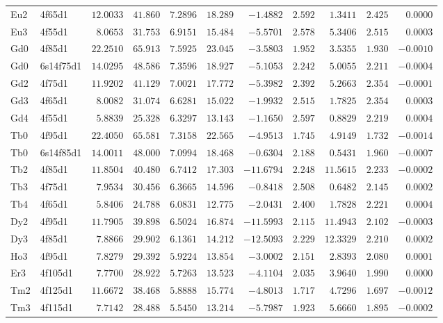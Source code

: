 \begin{table}[H]
{\begin{tabular}{llrrrrrrrrr}
Eu2 & 4f65d1 &$12.0033$ &$41.860$ &$7.2896$ &$18.289$ &$-1.4882$ &$2.592$ &$1.3411$ &$2.425$ &$0.0000$ \\
Eu3 & 4f55d1 &$8.0653$ &$31.753$ &$6.9151$ &$15.484$ &$-5.5701$ &$2.578$ &$5.3406$ &$2.515$ &$0.0003$ \\
Gd0 & 4f85d1 &$22.2510$ &$65.913$ &$7.5925$ &$23.045$ &$-3.5803$ &$1.952$ &$3.5355$ &$1.930$ &$-0.0010$ \\
Gd0 & 6s14f75d1 &$14.0295$ &$48.586$ &$7.3596$ &$18.927$ &$-5.1053$ &$2.242$ &$5.0055$ &$2.211$ &$-0.0004$ \\
Gd2 & 4f75d1 &$11.9202$ &$41.129$ &$7.0021$ &$17.772$ &$-5.3982$ &$2.392$ &$5.2663$ &$2.354$ &$-0.0001$ \\
Gd3 & 4f65d1 &$8.0082$ &$31.074$ &$6.6281$ &$15.022$ &$-1.9932$ &$2.515$ &$1.7825$ &$2.354$ &$0.0003$ \\
Gd4 & 4f55d1 &$5.8839$ &$25.328$ &$6.3297$ &$13.143$ &$-1.1650$ &$2.597$ &$0.8829$ &$2.219$ &$0.0004$ \\
Tb0 & 4f95d1 &$22.4050$ &$65.581$ &$7.3158$ &$22.565$ &$-4.9513$ &$1.745$ &$4.9149$ &$1.732$ &$-0.0014$ \\
Tb0 & 6s14f85d1 &$14.0011$ &$48.000$ &$7.0994$ &$18.468$ &$-0.6304$ &$2.188$ &$0.5431$ &$1.960$ &$-0.0007$ \\
Tb2 & 4f85d1 &$11.8504$ &$40.480$ &$6.7412$ &$17.303$ &$-11.6794$ &$2.248$ &$11.5615$ &$2.233$ &$-0.0002$ \\
Tb3 & 4f75d1 &$7.9534$ &$30.456$ &$6.3665$ &$14.596$ &$-0.8418$ &$2.508$ &$0.6482$ &$2.145$ &$0.0002$ \\
Tb4 & 4f65d1 &$5.8406$ &$24.788$ &$6.0831$ &$12.775$ &$-2.0431$ &$2.400$ &$1.7828$ &$2.221$ &$0.0004$ \\
Dy2 & 4f95d1 &$11.7905$ &$39.898$ &$6.5024$ &$16.874$ &$-11.5993$ &$2.115$ &$11.4943$ &$2.102$ &$-0.0003$ \\
Dy3 & 4f85d1 &$7.8866$ &$29.902$ &$6.1361$ &$14.212$ &$-12.5093$ &$2.229$ &$12.3329$ &$2.210$ &$0.0002$ \\
Ho3 & 4f95d1 &$7.8279$ &$29.392$ &$5.9224$ &$13.854$ &$-3.0002$ &$2.151$ &$2.8393$ &$2.080$ &$0.0001$ \\
Er3 & 4f105d1 &$7.7700$ &$28.922$ &$5.7263$ &$13.523$ &$-4.1104$ &$2.035$ &$3.9640$ &$1.990$ &$0.0000$ \\
Tm2 & 4f125d1 &$11.6672$ &$38.468$ &$5.8888$ &$15.774$ &$-4.8013$ &$1.717$ &$4.7296$ &$1.697$ &$-0.0012$ \\
Tm3 & 4f115d1 &$7.7142$ &$28.488$ &$5.5450$ &$13.214$ &$-5.7987$ &$1.923$ &$5.6660$ &$1.895$ &$-0.0002$ \\

\end{tabular}}
\end{table}
